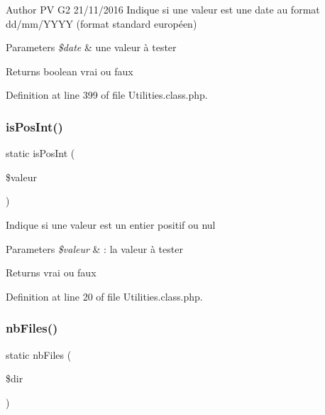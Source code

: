 \begin{DoxyAuthor}{Author}
PV G2 21/11/2016 Indique si une valeur est une date au format dd/mm/\+Y\+Y\+YY (format standard européen) 
\end{DoxyAuthor}

\begin{DoxyParams}{Parameters}
{\em \$date} & une valeur à tester \\
\hline
\end{DoxyParams}
\begin{DoxyReturn}{Returns}
boolean vrai ou faux 
\end{DoxyReturn}


Definition at line 399 of file Utilities.\+class.\+php.

\mbox{\label{class_utilities_af36aa51d20191f7718d33418001af3fb}} 
\subsubsection{\texorpdfstring{is\+Pos\+Int()}{isPosInt()}}
{\footnotesize\ttfamily static is\+Pos\+Int (\begin{DoxyParamCaption}\item[{}]{\$valeur }\end{DoxyParamCaption})\hspace{0.3cm}{\ttfamily [static]}}

Indique si une valeur est un entier positif ou nul 
\begin{DoxyParams}{Parameters}
{\em \$valeur} & \+: la valeur à tester \\
\hline
\end{DoxyParams}
\begin{DoxyReturn}{Returns}
vrai ou faux 
\end{DoxyReturn}


Definition at line 20 of file Utilities.\+class.\+php.

\mbox{\label{class_utilities_a34945d34c0465e88799eaeda066dfb53}} 
\subsubsection{\texorpdfstring{nb\+Files()}{nbFiles()}}
{\footnotesize\ttfamily static nb\+Files (\begin{DoxyParamCaption}\item[{}]{\$dir }\end{DoxyParamCaption})\hspace{0.3cm}{\ttfamily [static]}}

